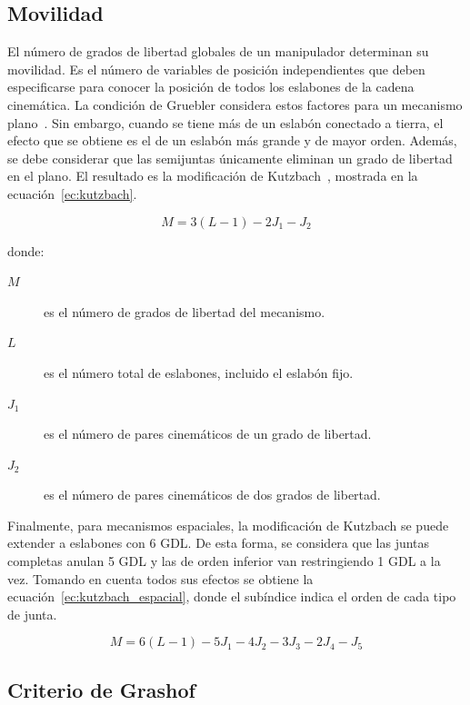 \subsection{Movilidad}

El número de grados de libertad globales de un manipulador determinan su movilidad. Es el número de variables de posición independientes que deben especificarse para conocer la posición de todos los eslabones de la cadena cinemática. La condición de Gruebler considera estos factores para un mecanismo plano~\cite{norton}. Sin embargo, cuando se tiene más de un eslabón conectado a tierra, el efecto que se obtiene es el de un eslabón más grande y de mayor orden. Además, se debe considerar que las semijuntas únicamente eliminan un grado de libertad en el plano. El resultado es la modificación de Kutzbach~\cite{norton}, mostrada en la ecuación~\ref{ec:kutzbach}.

\begin{equation}
\label{ec:kutzbach}
    M = 3(L-1)-2J_1-J_2
\end{equation}

donde:
\begin{description}
    \item[$M$] es el número de grados de libertad del mecanismo.
    \item[$L$] es el número total de eslabones, incluido el eslabón fijo.
    \item[$J_1$] es el número de pares cinemáticos de un grado de libertad.
    \item[$J_2$] es el número de pares cinemáticos de dos grados de libertad.
\end{description}

Finalmente, para mecanismos espaciales, la modificación de Kutzbach se puede extender a eslabones con 6 GDL. De esta forma, se considera que las juntas completas anulan 5 GDL y las de orden inferior van restringiendo 1 GDL a la vez. Tomando en cuenta todos sus efectos se obtiene la ecuación~\ref{ec:kutzbach_espacial}, donde el subíndice indica el orden de cada tipo de junta.

\begin{equation}
\label{ec:kutzbach_espacial}
    M = 6(L-1)-5J_1-4J_2-3J_3-2J_4-J_5
\end{equation}

\subsection{Criterio de Grashof}

